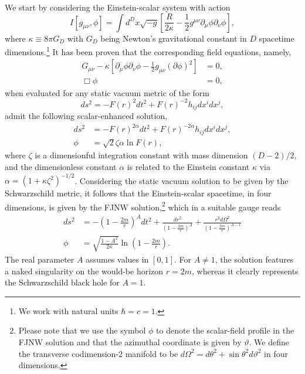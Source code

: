 \documentclass[aps,preprint,groupedaddress,nofootinbib,superscriptaddress,showkeys,showpacs,eqsecnum,amsmath,amssymb]{revtex4-1}
\begin{document}
We start by considering the Einstein-scalar system with action 
\begin{equation}
I[g_{\mu\nu},\phi]=\int d^{D}x\sqrt{-g}\left[  \frac{R}{2\kappa}-\frac{1}%
{2}g^{\mu\nu} \partial_\mu\phi\partial_\nu\phi\right] ,
\label{FJNWaction}%
\end{equation}
where $\kappa\equiv 8\pi G_{D}$ with $G_{D}$ being Newton's gravitational constant in $D$ spacetime dimensions.\footnote{We work with natural units $\hbar=c=1$.} It has been proven that the corresponding field equations, namely,
\begin{subequations}
\begin{align}
G_{\mu\nu}-\kappa\left[\partial_\mu\phi\partial_\nu\phi-\frac{1}{2}g_{\mu\nu}(\partial\phi)^2\right]&=0,\\
\Box\phi&=0,
\end{align}
\end{subequations}
when evaluated for any static vacuum metric of the form 
\begin{equation}
ds^2=-F(r)^2dt^2+F(r)^{-2}h_{ij}dx^idx^j,
\end{equation}
admit the following scalar-enhanced solution,
\begin{subequations}
\begin{align}
ds^2&=-F(r)^{2\alpha}dt^2+F(r)^{-2\alpha}h_{ij}dx^idx^j,\\
\phi&=\sqrt{2}\zeta\alpha\ln F(r), 
\end{align}
\end{subequations}
where $\zeta$ is a dimensionful integration constant with mass dimension $(D-2)/2$, and the dimensionless constant $\alpha$ is related to the Einstein constant $\kappa$ via $\alpha=(1+\kappa\zeta^2)^{-1/2}$. Considering the static vacuum solution to be given by the Schwarzschild metric, it follows that the Einstein-scalar spacetime, in four dimensions, is given by the FJNW solution,\footnote{Please note that we use the symbol $\phi$ to denote the scalar-field profile in the FJNW solution and that the azimuthal coordinate is given by $\vartheta$. We define the transverse codimension-2 manifold to be $d\Omega^2=d\theta^2+\sin\theta^2 d\vartheta^2$ in four dimensions.} which in a suitable gauge reads 
\begin{subequations}\label{janis}
\begin{align} 
     ds^2&=-\left(1-\frac{2m}{r}\right)^A dt^2 + \frac{d r^2}{\left(1-\frac{2m}{r}\right)^A} + \frac{r^2d\Omega^2}{\left(1-\frac{2m}{r}\right)^{A-1} }  \\
    \phi &= \sqrt{\frac{1-A^2}{2 \kappa}} \ln \left(1-\frac{2m}{r}\right).
\end{align}
\end{subequations}
The real parameter $A$ assumes values in $[0,1]$. For $A\neq1$, the solution features a naked singularity on the would-be horizon $r=2m$, whereas it clearly represents the Schwarzschild black hole for $A=1$. 
\end{document}
